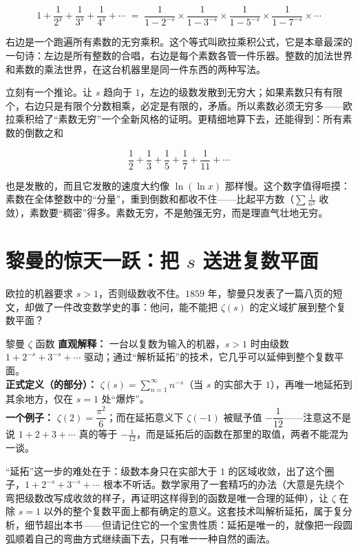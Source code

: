 \[
1+\frac{1}{2^{s}}+\frac{1}{3^{s}}+\frac{1}{4^{s}}+\cdots
\;=\;
\frac{1}{1-2^{-s}}\times\frac{1}{1-3^{-s}}\times\frac{1}{1-5^{-s}}\times\frac{1}{1-7^{-s}}\times\cdots
\]

右边是一个跑遍所有素数的无穷乘积。这个等式叫欧拉乘积公式，它是本章最深的一句诗：左边是所有整数的合唱，右边是每个素数各管一件乐器。整数的加法世界和素数的乘法世界，在这台机器里是同一件东西的两种写法。

立刻有一个推论。让 $s$ 趋向于 $1$，左边的级数发散到无穷大；如果素数只有有限个，右边只是有限个分数相乘，必定是有限的，矛盾。所以素数必须无穷多——欧拉乘积给了“素数无穷”一个全新风格的证明。更精细地算下去，还能得到：所有素数的倒数之和

\[
\frac12+\frac13+\frac15+\frac17+\frac1{11}+\cdots
\]

也是发散的，而且它发散的速度大约像 $\ln(\ln x)$ 那样慢。这个数字值得咂摸：素数在全体整数中的“分量”，重到倒数和都收不住——比起平方数（$\sum\frac{1}{n^2}$ 收敛），素数要“稠密”得多。素数无穷，不是勉强无穷，而是理直气壮地无穷。

\section{黎曼的惊天一跃：把 $s$ 送进复数平面}

欧拉的机器要求 $s>1$，否则级数收不住。$1859$ 年，黎曼只发表了一篇八页的短文，却做了一件改变数学史的事：他问，能不能把 $\zeta(s)$ 的定义域扩展到整个复数平面？

\begin{shuyu}{黎曼 $\zeta$ 函数}
\textbf{直观解释：} 一台以复数为输入的机器，$s>1$ 时由级数 $1+2^{-s}+3^{-s}+\cdots$ 驱动；通过“解析延拓”的技术，它几乎可以延伸到整个复数平面。\\
\textbf{正式定义（的部分）：} $\zeta(s)=\sum_{n=1}^{\infty} n^{-s}$（当 $s$ 的实部大于 $1$），再唯一地延拓到其余地方，仅在 $s=1$ 处“爆炸”。\\
\textbf{一个例子：} $\zeta(2)=\dfrac{\pi^{2}}{6}$；而在延拓意义下 $\zeta(-1)$ 被赋予值 $-\dfrac{1}{12}$——注意这不是说 $1+2+3+\cdots$ 真的等于 $-\frac{1}{12}$，而是延拓后的函数在那里的取值，两者不能混为一谈。
\end{shuyu}

“延拓”这一步的难处在于：级数本身只在实部大于 $1$ 的区域收敛，出了这个圈子，$1+2^{-s}+3^{-s}+\cdots$ 根本不听话。数学家用了一套精巧的办法（大意是先绕个弯把级数改写成收敛的样子，再证明这样得到的函数是唯一合理的延伸），让 $\zeta$ 在除 $s=1$ 以外的整个复数平面上都有确定的意义。这套技术叫解析延拓，属于复分析，细节超出本书——但请记住它的一个宝贵性质：延拓是唯一的，就像把一段圆弧顺着自己的弯曲方式继续画下去，只有唯一一种自然的画法。

